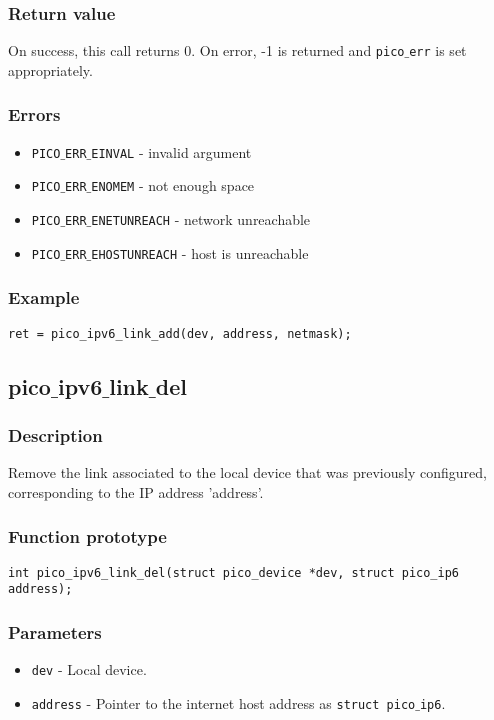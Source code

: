 \subsubsection*{Return value}
On success, this call returns 0.
On error, -1 is returned and \texttt{pico$\_$err} is set appropriately.

\subsubsection*{Errors}
\begin{itemize}[noitemsep]
\item \texttt{PICO$\_$ERR$\_$EINVAL} - invalid argument
\item \texttt{PICO$\_$ERR$\_$ENOMEM} - not enough space
\item \texttt{PICO$\_$ERR$\_$ENETUNREACH} - network unreachable
\item \texttt{PICO$\_$ERR$\_$EHOSTUNREACH} - host is unreachable
\end{itemize}

\subsubsection*{Example}
\begin{verbatim}
ret = pico_ipv6_link_add(dev, address, netmask);
\end{verbatim}



\subsection{pico$\_$ipv6$\_$link$\_$del}

\subsubsection*{Description}
Remove the link associated to the local device that was previously configured, corresponding to the IP address 'address'.

\subsubsection*{Function prototype}
\begin{verbatim}
int pico_ipv6_link_del(struct pico_device *dev, struct pico_ip6 address); 
\end{verbatim}

\subsubsection*{Parameters}
\begin{itemize}[noitemsep]
\item \texttt{dev} - Local device.
\item \texttt{address} - Pointer to the internet host address as \texttt{struct pico$\_$ip6}.
\end{itemize}


